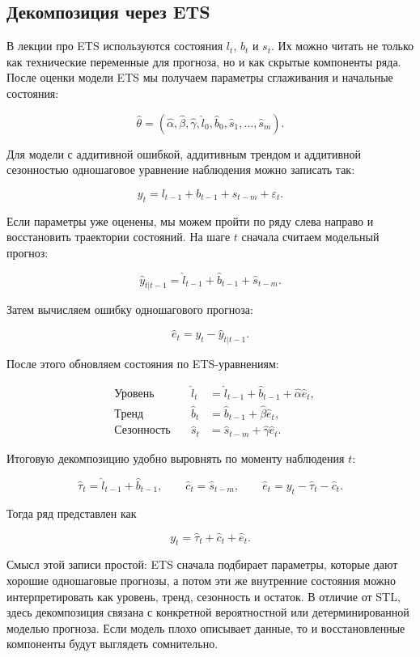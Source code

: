 \documentclass[12pt,fleqn]{article}
\begin{document}
\subsection{Декомпозиция через ETS}


В лекции про ETS используются состояния \(l_t\), \(b_t\) и \(s_t\).
Их можно читать не только как технические переменные для прогноза, но и как скрытые компоненты ряда.
После оценки модели ETS мы получаем параметры сглаживания и начальные состояния:

\[
\hat\theta
=
\left(
\hat\alpha,
\hat\beta,
\hat\gamma,
\hat l_0,
\hat b_0,
\hat s_1,\ldots,\hat s_m
\right).
\]

Для модели с аддитивной ошибкой, аддитивным трендом и аддитивной сезонностью одношаговое уравнение наблюдения можно записать так:

\[
y_t
=
l_{t-1}
+b_{t-1}
+s_{t-m}
+\varepsilon_t.
\]

Если параметры уже оценены, мы можем пройти по ряду слева направо и восстановить траектории состояний.
На шаге \(t\) сначала считаем модельный прогноз:

\[
\hat y_{t|t-1}
=
\hat l_{t-1}
+\hat b_{t-1}
+\hat s_{t-m}.
\]

Затем вычисляем ошибку одношагового прогноза:

\[
\hat e_t
=
y_t-\hat y_{t|t-1}.
\]

После этого обновляем состояния по ETS-уравнениям:

\[
\begin{array}{llll}
&\text{Уровень} \quad & \hat l_t
&=
\hat l_{t-1}
+\hat b_{t-1}
+\hat\alpha \hat e_t,\\
&\text{Тренд} \quad & \hat b_t
&=
\hat b_{t-1}
+\hat\beta \hat e_t,\\
&\text{Сезонность} \quad & \hat s_t
&=
\hat s_{t-m}
+\hat\gamma \hat e_t.
\end{array}
\]

Итоговую декомпозицию удобно выровнять по моменту наблюдения \(t\):

\[
\hat\tau_t
=
\hat l_{t-1}+\hat b_{t-1},
\qquad
\hat c_t
=
\hat s_{t-m},
\qquad
\hat e_t
=
y_t-\hat\tau_t-\hat c_t.
\]

Тогда ряд представлен как

\[
y_t
=
\hat\tau_t
+\hat c_t
+\hat e_t.
\]

Смысл этой записи простой: ETS сначала подбирает параметры, которые дают хорошие одношаговые прогнозы, а потом эти же внутренние состояния можно интерпретировать как уровень, тренд, сезонность и остаток.
В отличие от STL, здесь декомпозиция связана с конкретной вероятностной или детерминированной моделью прогноза.
Если модель плохо описывает данные, то и восстановленные компоненты будут выглядеть сомнительно.
\end{document}
